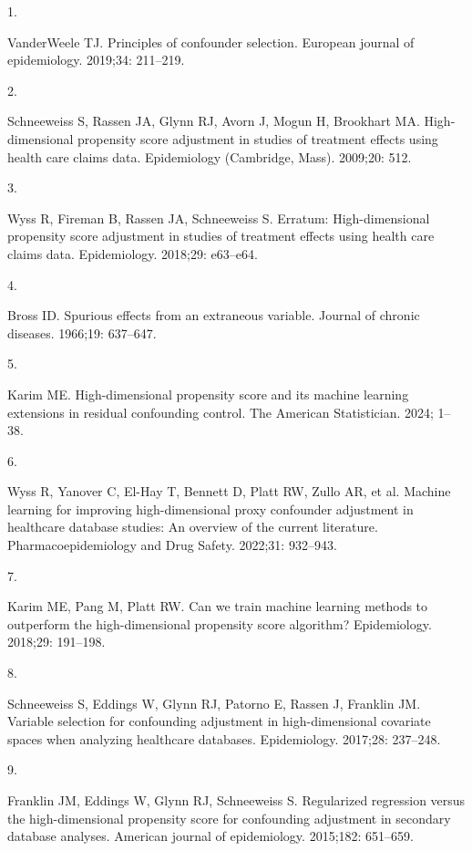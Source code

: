 \documentclass[10pt,letterpaper]{article}
\newlength{\cslhangindent}
\newlength{\csllabelwidth}
\newenvironment{CSLReferences}[2] %
 {\begin{list}{}{%
  \setlength{\itemindent}{0pt}
  \setlength{\leftmargin}{0pt}
  \setlength{\parsep}{0pt}
  \ifodd #1
   \setlength{\leftmargin}{\cslhangindent}
   \setlength{\itemindent}{-1\cslhangindent}
  \fi
  \setlength{\itemsep}{#2\baselineskip}}}
 {\end{list}}
\newcommand{\CSLLeftMargin}[1]{\parbox[t]{\csllabelwidth}{#1}}
\newcommand{\CSLRightInline}[1]{\parbox[t]{\linewidth - \csllabelwidth}{#1}\break}
\begin{document}
\label{refs}
\begin{CSLReferences}{0}{1}
\CSLLeftMargin{1. }%
\CSLRightInline{VanderWeele TJ. Principles of confounder selection.
European journal of epidemiology. 2019;34: 211--219. }

\CSLLeftMargin{2. }%
\CSLRightInline{Schneeweiss S, Rassen JA, Glynn RJ, Avorn J, Mogun H,
Brookhart MA. High-dimensional propensity score adjustment in studies of
treatment effects using health care claims data. Epidemiology
(Cambridge, Mass). 2009;20: 512. }

\CSLLeftMargin{3. }%
\CSLRightInline{Wyss R, Fireman B, Rassen JA, Schneeweiss S. Erratum:
High-dimensional propensity score adjustment in studies of treatment
effects using health care claims data. Epidemiology. 2018;29: e63--e64.
}

\CSLLeftMargin{4. }%
\CSLRightInline{Bross ID. Spurious effects from an extraneous variable.
Journal of chronic diseases. 1966;19: 637--647. }

\CSLLeftMargin{5. }%
\CSLRightInline{Karim ME. High-dimensional propensity score and its
machine learning extensions in residual confounding control. The
American Statistician. 2024; 1--38. }

\CSLLeftMargin{6. }%
\CSLRightInline{Wyss R, Yanover C, El-Hay T, Bennett D, Platt RW, Zullo
AR, et al. Machine learning for improving high-dimensional proxy
confounder adjustment in healthcare database studies: An overview of the
current literature. Pharmacoepidemiology and Drug Safety. 2022;31:
932--943. }

\CSLLeftMargin{7. }%
\CSLRightInline{Karim ME, Pang M, Platt RW. Can we train machine
learning methods to outperform the high-dimensional propensity score
algorithm? Epidemiology. 2018;29: 191--198. }

\CSLLeftMargin{8. }%
\CSLRightInline{Schneeweiss S, Eddings W, Glynn RJ, Patorno E, Rassen J,
Franklin JM. Variable selection for confounding adjustment in
high-dimensional covariate spaces when analyzing healthcare databases.
Epidemiology. 2017;28: 237--248. }

\CSLLeftMargin{9. }%
\CSLRightInline{Franklin JM, Eddings W, Glynn RJ, Schneeweiss S.
Regularized regression versus the high-dimensional propensity score for
confounding adjustment in secondary database analyses. American journal
of epidemiology. 2015;182: 651--659. }


\end{CSLReferences}
\end{document}
